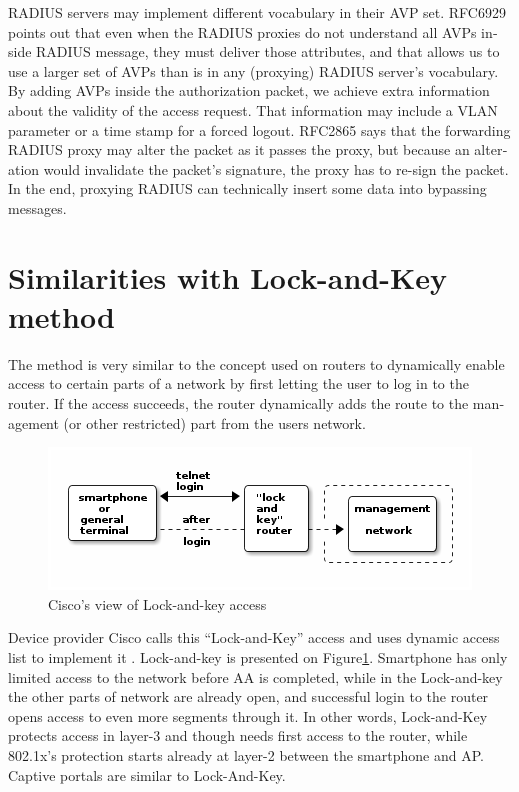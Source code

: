 \documentclass[12pt,a4paper,english]{tutthesis}
\begin{document}
\begin{otherlanguage}{english}
RADIUS servers may implement different vocabulary in their AVP set.
RFC6929 \cite{rfc6929} points out that even when
the RADIUS proxies do not understand all AVPs inside RADIUS message, they
must deliver those attributes, and that allows us to use a larger set of AVPs 
than is in any (proxying) RADIUS server's vocabulary.
By adding AVPs inside the authorization packet, we achieve extra
information about the validity of the access request.
That information may include a VLAN parameter or a time stamp for a forced
logout.
RFC2865 \cite{rfc2865} says that the forwarding RADIUS proxy may alter
the packet as it passes the proxy, but because an alteration would invalidate the
packet's signature, the proxy has to re-sign the packet.
In the end, proxying RADIUS can technically insert some data into 
bypassing messages.





\section{Similarities with Lock-and-Key method}
\label{sec-4-4}
The method is very similar to the concept used on routers to dynamically enable
access to certain parts of a network by first letting the user to log in
to the router. If the access succeeds, the router dynamically adds the
route to the management (or other restricted) part from the 
users network.




\begin{figure}[htb]
\centering
\includegraphics[width=.9\linewidth]{lockandkey.png}
\caption{\label{fig:lock-and-view}Cisco's view of Lock-and-key access}
\end{figure}




Device provider Cisco calls this  ``Lock-and-Key''
access and uses dynamic access list to implement it \cite[p.117]{lockandkeybook}.
Lock-and-key is presented on Figure\ref{fig:lock-and-view}.
 Smartphone has only limited access to the network before AA
is completed, while in the Lock-and-key
the other parts of network are already open, and successful login to the router opens
access to even more segments through it. In other words, Lock-and-Key
protects access in layer-3 and though needs first access to the router, while
802.1x's protection starts already at layer-2 between the smartphone
and AP. Captive portals are similar to Lock-And-Key.


\end{otherlanguage}
\end{document}
